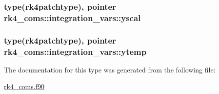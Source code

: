 \subsubsection[{yscal}]{\setlength{\rightskip}{0pt plus 5cm}type({\bf rk4patchtype}), pointer rk4\+\_\+coms\+::integration\+\_\+vars\+::yscal}\label{structrk4__coms_1_1integration__vars_ae6e62e452c7a2d6f61027f59c8de3b8c}
\hypertarget{structrk4__coms_1_1integration__vars_a65e3efd63a1824510230efa994043c65}{}
\subsubsection[{ytemp}]{\setlength{\rightskip}{0pt plus 5cm}type({\bf rk4patchtype}), pointer rk4\+\_\+coms\+::integration\+\_\+vars\+::ytemp}\label{structrk4__coms_1_1integration__vars_a65e3efd63a1824510230efa994043c65}


The documentation for this type was generated from the following file\+:\begin{DoxyCompactItemize}
\item 
\hyperlink{rk4__coms_8f90}{rk4\+\_\+coms.\+f90}\end{DoxyCompactItemize}

